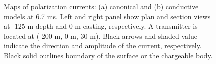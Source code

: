 \documentclass[extra,mreferee]{gji}
\begin{document}
\begin{figure}
  \caption{Maps of polarization currents: (a) canonical and (b) conductive models at 6.7 ms. Left and right panel show plan and section views at -125 m-depth and 0 m-easting, respectively. A transmitter is located at (-200 m, 0 m, 30 m). Black arrows and shaded value indicate the direction and amplitude of the current, respectively. Black solid outlines boundary of the surface or the chargeable body.}
  \label{F:Polarizationcurrent_late}
\end{figure}
\clearpage

\end{document}
